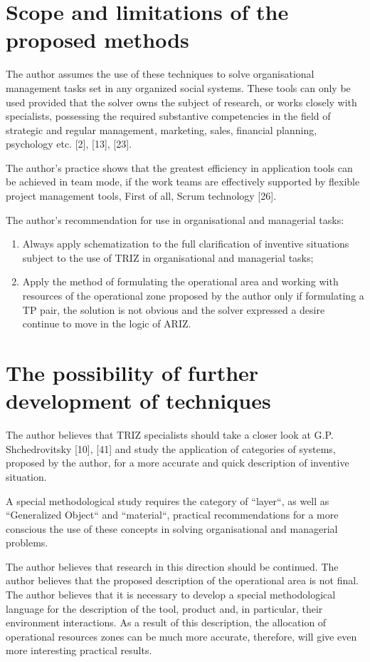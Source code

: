 \documentclass[11pt,a4paper]{book}
\begin{document}
\section{Scope and limitations of the proposed methods}

The author assumes the use of these techniques to solve organisational
management tasks set in any organized social systems.  These tools can only be
used provided that the solver owns the subject of research, or works closely
with specialists, possessing the required substantive competencies in the
field of strategic and regular management, marketing, sales, financial
planning, psychology etc. [2], [13], [23].

The author’s practice shows that the greatest efficiency in application tools
can be achieved in team mode, if the work teams are effectively supported by
flexible project management tools, First of all, Scrum technology [26].

The author's recommendation for use in organisational and managerial tasks:
\begin{enumerate}
\item Always apply schematization to the full clarification of inventive
  situations subject to the use of TRIZ in organisational and managerial
  tasks;
\item Apply the method of formulating the operational area and working with
  resources of the operational zone proposed by the author only if formulating
  a TP pair, the solution is not obvious and the solver expressed a desire
  continue to move in the logic of ARIZ.
\end{enumerate}

\section{The possibility of further development of techniques}

The author believes that TRIZ specialists should take a closer look at
G.P. Shchedrovitsky [10], [41] and study the application of categories of
systems, proposed by the author, for a more accurate and quick description of
inventive situation.

A special methodological study requires the category of “layer“, as well as
“Generalized Object“ and “material“, practical recommendations for a more conscious the use
of these concepts in solving organisational and managerial problems.

The author believes that research in this direction should be continued.  The
author believes that the proposed description of the operational area is not
final. The author believes that it is necessary to develop a special
methodological language for the description of the tool, product and, in
particular, their environment interactions. As a result of this description,
the allocation of operational resources zones can be much more accurate,
therefore, will give even more interesting practical results.
\end{document}
